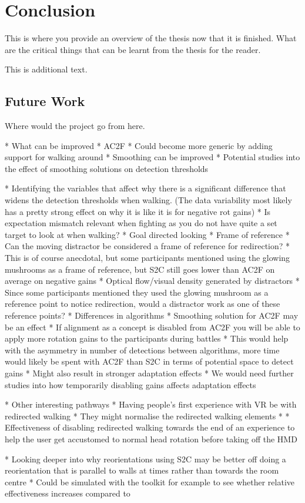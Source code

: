 \chapter{Conclusion}
\label{chap:conclusion}

This is where you provide an overview of the thesis now that it is finished.  What are the critical things that can be learnt from the thesis for the reader.

This is additional text.

\section{Future Work}
\label{sec:future}
Where would the project go from here.

* What can be improved
* AC2F
   * Could become more generic by adding support for walking around
   * Smoothing can be improved
   * Potential studies into the effect of smoothing solutions on detection thresholds

* Identifying the variables that affect why there is a significant difference that widens the detection thresholds when walking. (The data variability most likely has a pretty strong effect on why it is like it is for negative rot gains)
   * Is expectation mismatch relevant when fighting as you do not have quite a set target to look at when walking?
      * Goal directed looking
   * Frame of reference
      * Can the moving distractor be considered a frame of reference for redirection?
      * This is of course anecdotal, but some participants mentioned using the glowing mushrooms as a frame of reference, but S2C still goes lower than AC2F on average on negative gains
      * Optical flow/visual density generated by distractors
         * Since some participants mentioned they used the glowing mushroom as a reference point to notice redirection, would a distractor work as one of these reference points?
   * Differences in algorithms
      * Smoothing solution for AC2F may be an effect
      * If alignment as a concept is disabled from AC2F you will be able to apply more rotation gains to the participants during battles
         * This would help with the asymmetry in number of detections between algorithms, more time would likely be spent with AC2F than S2C in terms of potential space to detect gains
         * Might also result in stronger adaptation effects
            * We would need further studies into how temporarily disabling gains affects adaptation effects

* Other interesting pathways
   * Having people's first experience with VR be with redirected walking
      * They might normalise the redirected walking elements
         * 
   * Effectiveness of disabling redirected walking towards the end of an experience to help the user get accustomed to normal head rotation before taking off the HMD
   
   * Looking deeper into why reorientations using S2C may be better off doing a reorientation that is parallel to walls at times rather than towards the room centre
      * Could be simulated with the toolkit for example to see whether relative effectiveness increases compared to 
